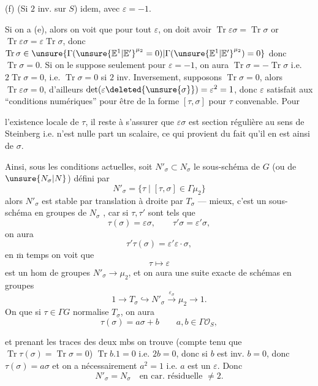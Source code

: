 (f) (Si $2$ inv. sur $S$) idem, avec $\varepsilon=-1$.

Si on a (e), alors on voit que pour tout  $\varepsilon$,
on doit avoir $\operatorname{Tr}\varepsilon\sigma=\operatorname{Tr}\sigma$
or $\operatorname{Tr}\varepsilon\sigma=\varepsilon\operatorname{Tr}\sigma$, donc
$\operatorname{Tr}\sigma\in\unsure{\Gamma(\unsure{\mathbb E^1|\mathbb E'}^{\mu_2}=0)|\Gamma(\unsure{\mathbb E^1|\mathbb E'}^{\mu_2})=0}$
donc $\operatorname{Tr}\sigma=0$. Si on le suppose seulement pour $\varepsilon=-1$,
on aura $\operatorname{Tr}\sigma=-\operatorname{Tr}\sigma$ i.e.
$2\operatorname{Tr}\sigma=0$, i.e. $\operatorname{Tr}\sigma=0$ si $2$ inv.
Inversement, supposons $\operatorname{Tr}\sigma=0$, alors
$\operatorname{Tr}\varepsilon\sigma=0$, d'ailleurs
$\det(\varepsilon\deleted{\unsure{\sigma}})=\varepsilon^2=1$, donc $\varepsilon$ satisfait
aux ``conditions numériques'' pour être de la forme $[\tau,\sigma]$ pour
$\tau$ convenable. Pour

 l'existence locale de $\tau$, il reste à s'assurer que
$\varepsilon\sigma$ est section régulière au sens de Steinberg i.e. n'est nulle part
un scalaire, ce qui provient du fait qu'il en est ainsi de $\sigma$.

Ainsi, sous les conditions actuelles, soit $N'_\sigma\subset N_\sigma$ le sous-schéma de
 $G$ (ou de $\unsure{N_\sigma|N}$) défini par
\[
\tag{22}
N'_\sigma=\{\tau\mid[\tau,\sigma]\in\Gamma\mu_2\}
\]
alors $N'_\sigma$ est stable par translation à droite par $T_\sigma$ --- mieux,
c'est un sous-schéma en groupes de $N_\sigma$ , car si
$\tau,\tau'$ sont tels que
\[
\tau(\sigma)=\varepsilon\sigma,\qquad\tau'\sigma=\varepsilon'\sigma,
\]
on aura
\[
\tau'\tau(\sigma)=\varepsilon'\varepsilon\cdot\sigma,
\]
en $\overline{\mathrm m}$ temps on voit que
\[
\tau\longmapsto\varepsilon
\]
est un hom de groupes $N'_\sigma\longrightarrow\mu_2$, et on aura une suite exacte de
schémas en groupes
\[
\tag{23}
1\longrightarrow T_\sigma\hookrightarrow N'_\sigma
\xrightarrow{\varepsilon_\sigma}\mu_2\longrightarrow1.
\]
On  que si $\tau\in\Gamma G$ normalise $T_\sigma$, on aura
\[
\tau(\sigma)=a\sigma+b\qquad a,b\in\Gamma\mathcal O_S,
\]

et prenant les traces des deux mbs on trouve (compte tenu que
$\operatorname{Tr}\tau(\sigma)=\operatorname{Tr}\sigma=0$)
$\operatorname{Tr}b.1=0$ i.e. $2b=0$, donc si $b$ est inv.
$b=0$, donc $\tau(\sigma)=a\sigma$ et on a nécessairement $a^2=1$ i.e. $a$ est un
$\varepsilon$. Donc
\[
\tag{24}
N'_\sigma=N_\sigma\quad\text{en car. résiduelle }\ne2.
\]

